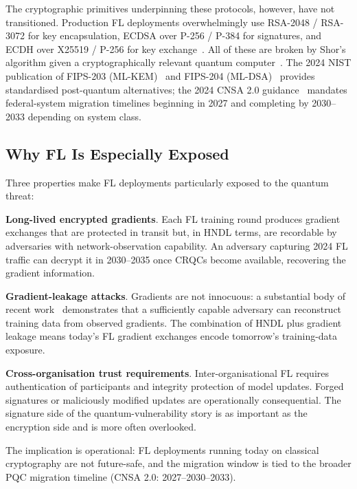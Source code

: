 \documentclass[sigconf,nonacm]{acmart}
\begin{document}
The cryptographic primitives underpinning these protocols, however,
have not transitioned. Production FL deployments overwhelmingly use
RSA-2048 / RSA-3072 for key encapsulation, ECDSA over P-256 / P-384
for signatures, and ECDH over X25519 / P-256 for key
exchange~\cite{bonawitz2017secagg,bell2020secagg}. All of these are
broken by Shor's algorithm given a cryptographically relevant quantum
computer~\cite{shor1994algorithms,gidney2025quantumlogic}. The 2024
NIST publication of FIPS-203 (ML-KEM)~\cite{nist2024fips203} and
FIPS-204 (ML-DSA)~\cite{nist2024fips204} provides standardised
post-quantum alternatives; the 2024 CNSA 2.0
guidance~\cite{nsa2024cnsa2} mandates federal-system migration timelines
beginning in 2027 and completing by 2030--2033 depending on system
class.

\subsection{Why FL Is Especially Exposed}

Three properties make FL deployments particularly exposed to the
quantum threat:

\textbf{Long-lived encrypted gradients}. Each FL training round
produces gradient exchanges that are protected in transit but, in
HNDL terms, are recordable by adversaries with network-observation
capability. An adversary capturing 2024 FL traffic can decrypt it
in 2030--2035 once CRQCs become available, recovering the gradient
information.

\textbf{Gradient-leakage attacks}. Gradients are not innocuous: a
substantial body of recent work~\cite{zhu2019dlg,geiping2020inverting,
yin2024leakage} demonstrates that a sufficiently capable adversary
can reconstruct training data from observed gradients. The
combination of HNDL plus gradient leakage means today's FL gradient
exchanges encode tomorrow's training-data exposure.

\textbf{Cross-organisation trust requirements}. Inter-organisational
FL requires authentication of participants and integrity protection
of model updates. Forged signatures or maliciously modified updates
are operationally consequential. The signature side of the
quantum-vulnerability story is as important as the encryption side
and is more often overlooked.

The implication is operational: FL deployments running today on
classical cryptography are not future-safe, and the migration window
is tied to the broader PQC migration timeline (CNSA 2.0:
2027--2030--2033).
\end{document}
